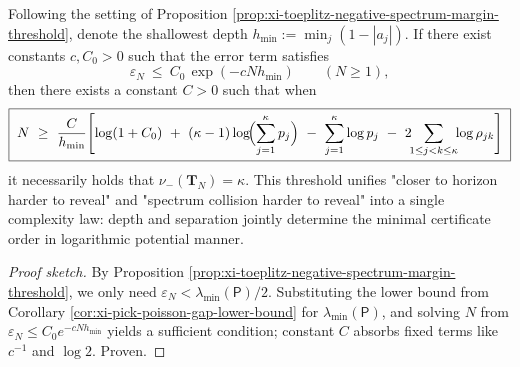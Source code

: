 \begin{corollary}\label{cor:xi-toeplitz-visibility-complexity-threshold}
Following the setting of Proposition \ref{prop:xi-toeplitz-negative-spectrum-margin-threshold}, denote the shallowest depth
\(
h_{\min}:=\min_j(1-|a_j|).
\)
If there exist constants \(c,C_0>0\) such that the error term satisfies
\[
\varepsilon_N\ \le\ C_0\,\exp(-cNh_{\min})\qquad(N\ge 1),
\]
then there exists a constant \(C>0\) such that when
\[
\boxed{\;
N\ \ge\ \frac{C}{h_{\min}}\Biggl[
\log(1+C_0)\ +\ (\kappa-1)\log\!\Bigl(\sum_{j=1}^{\kappa}p_j\Bigr)
\ -\ \sum_{j=1}^{\kappa}\log p_j
\ -\ 2\!\!\sum_{1\le j<k\le\kappa}\!\!\log\rho_{jk}
\Biggr]\;}
\]
it necessarily holds that \(\nu_-(\mathbf{T}_N)=\kappa\).
This threshold unifies "closer to horizon harder to reveal" and "spectrum collision harder to reveal" into a single complexity law: depth and separation jointly determine the minimal certificate order in logarithmic potential manner.
\end{corollary}
\begin{proof}[Proof sketch]
By Proposition \ref{prop:xi-toeplitz-negative-spectrum-margin-threshold}, we only need \(\varepsilon_N<\lambda_{\min}(\mathsf P)/2\).
Substituting the lower bound from Corollary \ref{cor:xi-pick-poisson-gap-lower-bound} for \(\lambda_{\min}(\mathsf P)\), and solving \(N\) from
\(\varepsilon_N\le C_0e^{-cNh_{\min}}\) yields a sufficient condition; constant \(C\) absorbs fixed terms like \(c^{-1}\) and \(\log 2\). Proven.
\end{proof}

